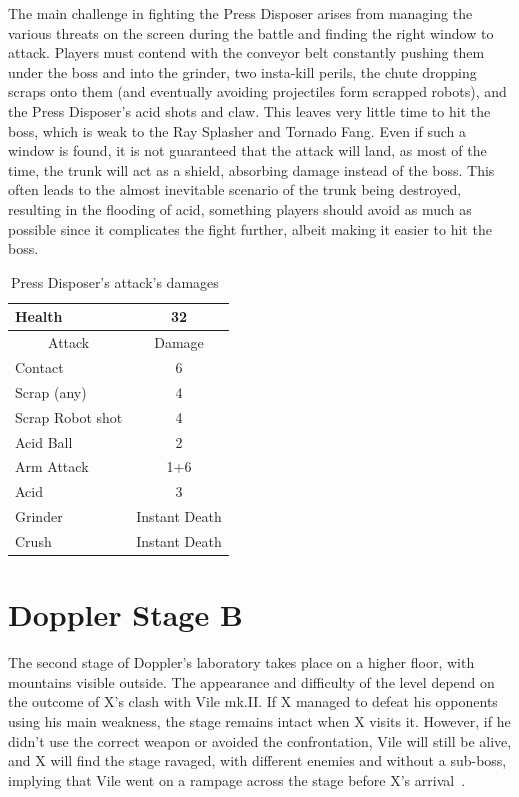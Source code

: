 The main challenge in fighting the Press Disposer arises from managing the various threats on the screen during the battle and finding the right window to attack. Players must contend with the conveyor belt constantly pushing them under the boss and into the grinder, two insta-kill perils, the chute dropping scraps onto them (and eventually avoiding projectiles form scrapped robots), and the Press Disposer's acid shots and claw. This leaves very little time to hit the boss, which is weak to the Ray Splasher and Tornado Fang. Even if such a window is found, it is not guaranteed that the attack will land, as most of the time, the trunk will act as a shield, absorbing damage instead of the boss. This often leads to the almost inevitable scenario of the trunk being destroyed, resulting in the flooding of acid, something players should avoid as much as possible since it complicates the fight further, albeit making it easier to hit the boss.

\begin{table}[htp]
	\centering
	\begin{tabular}[h]{l c}
		\toprule
		Health  & 32\\
		\midrule
		\multicolumn{1}{c}{Attack} & \multicolumn{1}{c}{Damage}\\
		Contact & 6\\
		Scrap (any)& 4\\
		Scrap Robot shot& 4\\
		Acid Ball& 2\\
		Arm Attack& 1+6\\
		Acid& 3\\
		Grinder& Instant Death\\
		Crush& Instant Death\\
		\bottomrule
	\end{tabular}
	\caption{Press Disposer's attack's damages~\cite{wiki:Byte,book:Compendium}}
\end{table} 

\section{Doppler Stage B}

The second stage of Doppler's laboratory takes place on a higher floor, with mountains visible outside. The appearance and difficulty of the level depend on the outcome of X's clash with Vile mk.II. If X managed to defeat his opponents using his main weakness, the stage remains intact when X visits it. However, if he didn't use the correct weapon or avoided the confrontation, Vile will still be alive, and X will find the stage ravaged, with different enemies and without a sub-boss, implying that Vile went on a rampage across the stage before X's arrival~\cite{wiki:Doppler_stage}.

